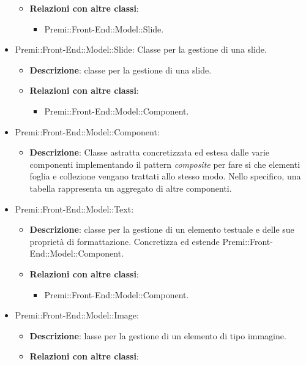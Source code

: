 \begin{itemize}
\begin{itemize}
				\item \textbf{Relazioni con altre classi}:
				\begin{itemize}
					\item Premi::Front-End::Model::Slide.
				\end{itemize}
			\end{itemize}
		 \item Premi::Front-End::Model::Slide: Classe per la gestione di una \gls{slide}.
			\begin{itemize}
				\item \textbf{Descrizione}: classe per la gestione di una \gls{slide}.
				\item \textbf{Relazioni con altre classi}:
				\begin{itemize}
					\item Premi::Front-End::Model::Component.
				\end{itemize}
			\end{itemize}
		 \item  Premi::Front-End::Model::Component: 
			\begin{itemize}
				\item \textbf{Descrizione}: Classe astratta concretizzata ed estesa dalle varie componenti implementando il pattern \textit{composite} per fare si che elementi foglia e collezione vengano trattati allo stesso modo. Nello specifico, una tabella rappresenta un aggregato di altre componenti.
			\end{itemize}
		 \item  Premi::Front-End::Model::Text:
			\begin{itemize}
				\item \textbf{Descrizione}: classe per la gestione di un elemento testuale e delle sue proprietà di formattazione. Concretizza ed estende Premi::Front-End::Model::Component.
				\item \textbf{Relazioni con altre classi}:
				\begin{itemize}
					\item Premi::Front-End::Model::Component.
				\end{itemize}
			\end{itemize}
		 \item  Premi::Front-End::Model::Image:
			\begin{itemize}
				\item \textbf{Descrizione}: lasse per la gestione di un elemento di tipo immagine.
				\item \textbf{Relazioni con altre classi}:
				\begin{itemize}

\end{itemize}
\end{itemize}
\end{itemize}
